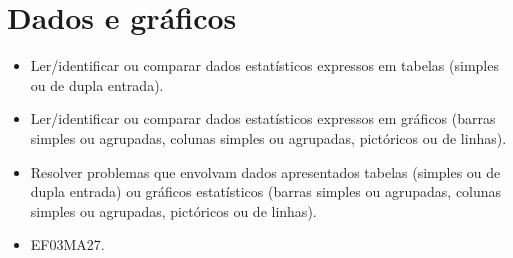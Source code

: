 \chapter{Dados e gráficos}


\begin{itemize}
\item Ler/identificar ou comparar dados estatísticos expressos em tabelas
(simples ou de dupla entrada).

\item Ler/identificar ou comparar dados estatísticos expressos em gráficos
(barras simples ou agrupadas, colunas simples ou agrupadas, pictóricos
ou de linhas).

\item Resolver problemas que envolvam dados apresentados tabelas (simples ou
de dupla entrada) ou gráficos estatísticos (barras simples ou agrupadas,
colunas simples ou agrupadas, pictóricos ou de linhas).
\end{itemize}


\begin{itemize}
  \item 
 EF03MA27.
\end{itemize}

